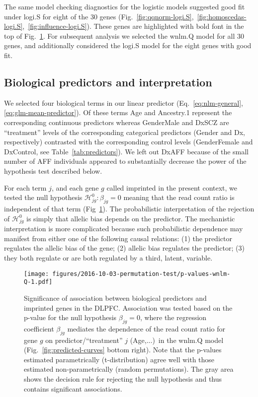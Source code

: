 \documentclass[12pt,letterpaper]{article}
\begin{document}
The same model checking diagnostics for the logistic models suggested good
fit under logi.S for eight of the 30 genes
(Fig.~\ref{fig:qqnorm-logi.S},~\ref{fig:homoscedas-logi.S},~\ref{fig:influence-logi.S}).
These genes are highlighted with bold font in the top of Fig.~\ref{fig:pval-wnlm.Q}.
For subsequent analysis we selected  the wnlm.Q model for all 30 genes, and
additionally considered the logi.S model for the eight
genes with good fit.

\subsection{Biological predictors and interpretation}

We selected four biological terms in our linear predictor
(Eq.~\ref{eq:nlm-general}, \ref{eq:glm-mean-predictor}).  Of these terms Age
and Ancestry.1 represent the corresponding continuous predictors whereas
GenderMale and DxSCZ are “treatment” levels of the corresponding categorical
predictors (Gender and Dx, respectively) contrasted with the corresponding
control levels (GenderFemale and DxControl, see Table~\ref{tab:predictors}).
We left out DxAFF because of the small number of AFF individuals appeared to
substantially decrease the power of the hypothesis test described below.

For each term \(j\), and each gene \(g\) called imprinted in the present
context, we tested the null hypothesis \(\mathcal{H}^0_{jg} : \beta_{jg} = 0\)
meaning that the read count ratio is independent of that term
(Fig~\ref{fig:pval-wnlm.Q}).  The probabilistic interpretation of the
rejection of \(\mathcal{H}^0_{jg}\) is simply that allelic bias depends on
the predictor.  The mechanistic interpretation is more complicated because
such probabilistic dependence may manifest from either one of the following
causal relations: (1) the predictor regulates the allelic bias of the gene;
(2) allelic bias regulates the predictor; (3) they both regulate or are both
regulated by a third, latent, variable.

\begin{figure}
\begin{center}
\texttt{[image: figures/2016-10-03-permutation-test/p-values-wnlm-Q-1.pdf]}
\end{center}
\caption{
Significance of association between biological predictors and imprinted genes
in the DLPFC.  Association was tested based on the p-value for the null
hypothesis \(\beta_{jg}=0\), where the regression coefficient \(\beta_{jg}\)
mediates the dependence of the read count ratio for gene \(g\) on
predictor/``treatment'' \(j\) (Age,...)~in the wnlm.Q model
(Fig.~\ref{fig:predicted-curves} bottom right).  Note that the p-values
estimated parametrically (t-distribution) agree well with those estimated
non-parametrically (random permutations).  The gray area shows the decision
rule for rejecting the null hypothesis and thus contains significant
associations.
}
\label{fig:pval-wnlm.Q}
\end{figure}
\end{document}
